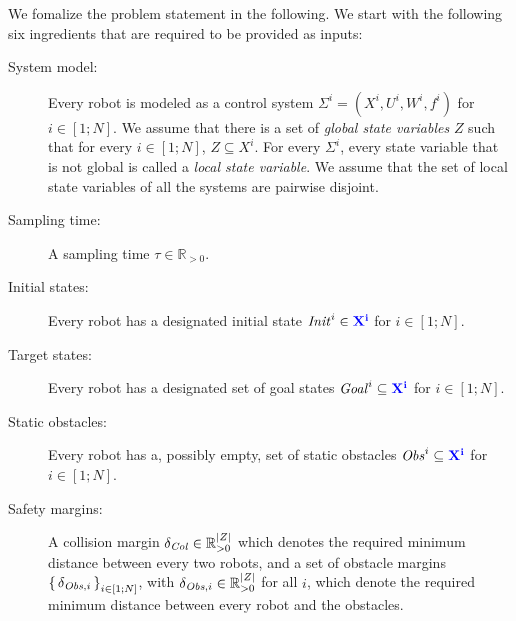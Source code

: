 We fomalize the problem statement in the following.
We start with the following six ingredients that are required to be provided as inputs:
\begin{description}
	\item[System model:] Every robot is modeled as a control system $\Sigma^i = (X^i, U^i, W^i, f^i)$ for $i\in [1;N]$. 
	We assume that there is a set of \emph{global state variables} $Z$ such that for every $i\in [1;N]$, $Z\subseteq X^i$.
	For every $\Sigma^i$, every state variable that is not global is called a \emph{local state variable}.
	We assume that the set of local state variables of all the systems are pairwise disjoint. 
	\item[Sampling time:] A sampling time $\tau\in \mathbb{R}_{>0}$.
	\item[Initial states:] Every robot has a designated initial state $\mathit{Init}^i\in {\color{blue} \mathbf{X^i}}$ for $i\in [1;N]$.
	\item[Target states:] Every robot has a designated set of goal states $\mathit{Goal}^i\subseteq {\color{blue} \mathbf{X^i}}$  for $i\in [1;N]$.
	\item[Static obstacles:] Every robot has a, possibly empty, set of static obstacles $\mathit{Obs}^i\subseteq {\color{blue} \mathbf{X^i}}$  for $i\in [1;N]$.
	\item[Safety margins:] A collision margin $\delta_{\mathit{Col}}\in \mathbb{R}^{|Z|}_{>0}$ which denotes the required minimum distance between every two robots, and a set of obstacle margins $\set{\delta_{\mathit{Obs},i}}_{i\in [1;N]}$, with $\delta_{\mathit{Obs},i}\in \mathbb{R}^{|Z|}_{>0}$ for all $i$, which denote the required minimum distance between every robot and the obstacles.
\end{description}


